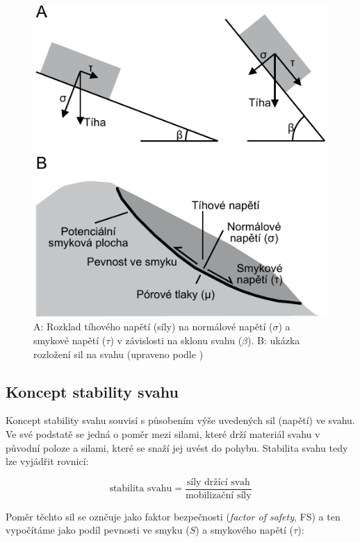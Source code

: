 \begin{figure}[h]
	\centering
	\includegraphics[width=1\linewidth]{obrazky/slope/svah_napeti}
	\caption{A: Rozklad tíhového napětí (síly) na normálové napětí ($\sigma$) a smykové napětí ($\tau$) v závislosti na sklonu svahu ($\beta$). B: ukázka rozložení sil na svahu (upraveno podle \textcite{selbyHillslopeMaterialsProcesses1993})}
	\label{fig:svahnapeti}
\end{figure}

\subsection{Koncept stability svahu}
Koncept stability svahu souvisí s působením výše uvedených sil (napětí) ve svahu. Ve své podstatě se jedná o poměr mezi silami, které drží materiál svahu v původní poloze a silami, které se snaží jej uvést do pohybu. Stabilita svahu tedy lze vyjádřit rovnicí:

\begin{equation}
\text{stabilita svahu} = \frac{\text{síly držící svah}}{\text{mobilizační síly}}	
\end{equation}

Poměr těchto sil se oznčuje jako faktor bezpečnosti (\textit{factor of safety}, FS) a ten vypočítáme jako podíl pevnosti ve smyku ($S$) a smykového napětí ($\tau$):

